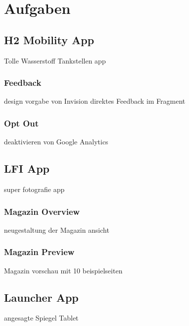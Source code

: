 \newpage
\chapter{Aufgaben}

\section{H2 Mobility App}
Tolle Wasserstoff Tankstellen app
\subsection{Feedback}
design vorgabe von Invision
direktes Feedback im Fragment
\subsection{Opt Out}
deaktivieren von Google Analytics

\section{LFI App}
super fotografie app
\subsection{Magazin Overview}
neugestaltung der Magazin ansicht
\subsection{Magazin Preview}
Magazin vorschau mit 10 beispielseiten

\section{Launcher App}
angesagte Spiegel Tablet
